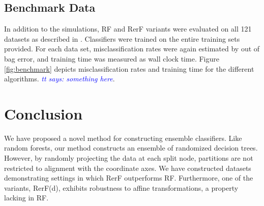 \documentclass{article} %
\providecommand{\tt}[1]{\textcolor{blue}{\it tt says: #1}}
\begin{document}

\subsection{Benchmark Data}

In addition to the simulations, RF and RerF variants were evaluated on all 121 datasets as described in \cite{Delgado14}. Classifiers were trained on the entire training sets provided. For each data set, misclassification rates were again estimated by out of bag error, and training time was measured as wall clock time.  Figure \ref{fig:benchmark} depicts misclassification rates and training time for the different algorithms.  
\tt{something here}.

\section{Conclusion}

We have proposed a novel method for constructing ensemble classifiers. Like random forests, our method constructs an ensemble of randomized decision trees. However, by randomly projecting the data at each split node, partitions are not restricted to alignment with the coordinate axes. We have constructed datasets demonstrating settings in which RerF outperforms RF. Furthermore, one of the variants, RerF(d), exhibits robustness to affine transformations, a property lacking in RF.
\end{document}
